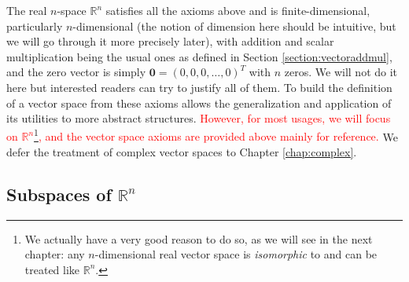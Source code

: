 The real $n$-space $\mathbb{R}^n$ satisfies all the axioms above and is finite-dimensional, particularly $n$-dimensional (the notion of dimension here should be intuitive, but we will go through it more precisely later), with addition and scalar multiplication being the usual ones as defined in Section \ref{section:vectoraddmul}, and the zero vector is simply $\textbf{0} = (0,0,0,\ldots,0)^T$ with $n$ zeros. We will not do it here but interested readers can try to justify all of them. To build the definition of a vector space from these axioms allows the generalization and application of its utilities to more abstract structures. \textcolor{red}{However, for most usages, we will focus on $\mathbb{R}^n$\footnote{We actually have a very good reason to do so, as we will see in the next chapter: any $n$-dimensional real vector space is \textit{isomorphic} to and can be treated like $\mathbb{R}^n$.}, and the vector space axioms are provided above mainly for reference.} We defer the treatment of complex vector spaces to Chapter \ref{chap:complex}.

\subsection{Subspaces of $\mathbb{R}^n$}
\label{section:Rnsubspace}

